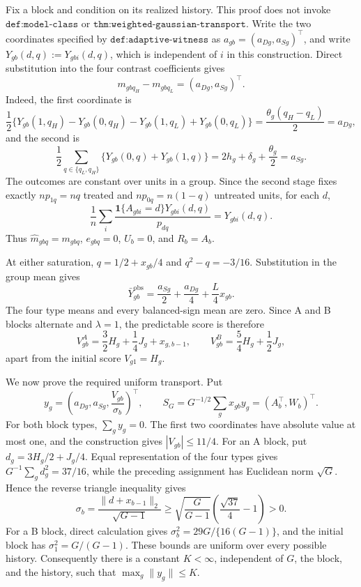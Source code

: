 Fix a block and condition on its realized history.  This proof does not invoke \(\texttt{def:model-class}\) or \(\texttt{thm:weighted-gaussian-transport}\).  Write the two coordinates specified by \(\texttt{def:adaptive-witness}\) as \(a_{gb}=(a_{Dg},a_{Sg})^\top\), and write \(Y_{gb}(d,q):=Y_{gbi}(d,q)\), which is independent of \(i\) in this construction.  Direct substitution into the four contrast coefficients gives
\[
 m_{gbq_H}-m_{gbq_L}=(a_{Dg},a_{Sg})^\top.                 \tag{22}
\]
Indeed, the first coordinate is
\[
 \frac12\{Y_{gb}(1,q_H)-Y_{gb}(0,q_H)
             -Y_{gb}(1,q_L)+Y_{gb}(0,q_L)\}
 =\frac{\theta_g(q_H-q_L)}2=a_{Dg},
\]
and the second is
\[
 \frac12\sum_{q\in\{q_L,q_H\}}\{Y_{gb}(0,q)+Y_{gb}(1,q)\}
 =2h_g+\delta_g+\frac{\theta_g}{2}=a_{Sg}.
\]
The outcomes are constant over units in a group.  Since the second stage fixes exactly \(np_{1q}=nq\) treated and \(np_{0q}=n(1-q)\) untreated units, for each \(d\),
\[
 \frac1n\sum_i\frac{\mathbf1\{A_{gbi}=d\}Y_{gbi}(d,q)}{p_{dq}}
 =Y_{gbi}(d,q).
\]
Thus \(\widehat m_{gbq}=m_{gbq}\), \(e_{gbq}=0\), \(U_b=0\), and \(R_b=A_b\).

At either saturation, \(q=1/2+x_{gb}/4\) and \(q^2-q=-3/16\).  Substitution in the group mean gives
\[
 \bar Y^{\mathrm{obs}}_{gb}=\frac{a_{Sg}}2+\frac{a_{Dg}}4+\frac L4x_{gb}.
\]
The four type means and every balanced-sign mean are zero.  Since A and B blocks alternate and \(\lambda=1\), the predictable score is therefore
\[
 V_{gb}^{A}=\frac32H_g+\frac14J_g+x_{g,b-1},
 \qquad V_{gb}^{B}=\frac54H_g+\frac12J_g,
\]
apart from the initial score \(V_{g1}=H_g\).

We now prove the required uniform transport.  Put
\[
 y_g=\left(a_{Dg},a_{Sg},\frac{V_{gb}}{\sigma_b}\right)^\top,
 \qquad S_G=G^{-1/2}\sum_gx_{gb}y_g=(A_b^\top,W_b)^\top.
\]
For both block types, \(\sum_gy_g=0\).  The first two coordinates have absolute value at most one, and the construction gives \(|V_{gb}|\leq11/4\).  For an A block, put \(d_g=3H_g/2+J_g/4\).  Equal representation of the four types gives \(G^{-1}\sum_gd_g^2=37/16\), while the preceding assignment has Euclidean norm \(\sqrt G\).  Hence the reverse triangle inequality gives
\[
 \sigma_b=\frac{\|d+x_{b-1}\|_2}{\sqrt{G-1}}
 \geq\sqrt{\frac G{G-1}}\left(\frac{\sqrt{37}}4-1\right)>0.
\]
For a B block, direct calculation gives \(\sigma_b^2=29G/\{16(G-1)\}\), and the initial block has \(\sigma_1^2=G/(G-1)\).  These bounds are uniform over every possible history.  Consequently there is a constant \(K<\infty\), independent of \(G\), the block, and the history, such that \(\max_g\|y_g\|\leq K\).

